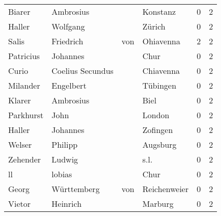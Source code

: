 \begin{center}
\begin{tiny}
\begin{longtabu}{llllrr}
                   Biarer &                          Ambrosius &             &                                    Konstanz &          0 &         2 \\
                   Haller &                           Wolfgang &             &                                      Zürich &          0 &         2 \\
                    Salis &                          Friedrich &         von &                                   Ohiavenna &          2 &         2 \\
                Patricius &                           Johannes &             &                                        Chur &          0 &         2 \\
                    Curio &                   Coelius Secundus &             &                                   Chiavenna &          0 &         2 \\
                 Milander &                          Engelbert &             &                                    Tübingen &          0 &         2 \\
                   Klarer &                          Ambrosius &             &                                        Biel &          0 &         2 \\
                Parkhurst &                               John &             &                                      London &          0 &         2 \\
                   Haller &                           Johannes &             &                                    Zofingen &          0 &         2 \\
                   Welser &                            Philipp &             &                                    Augsburg &          0 &         2 \\
                 Zehender &                             Ludwig &             &                                        s.l. &          0 &         2 \\
                       ll &                             lobias &             &                                        Chur &          0 &         2 \\
                    Georg &                        Württemberg &         von &                                Reichenweier &          0 &         2 \\
                   Vietor &                           Heinrich &             &                                     Marburg &          0 &         2 \\

\end{longtabu}
\end{tiny}
\end{center}
